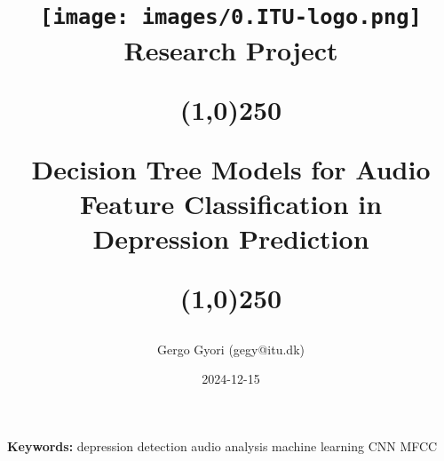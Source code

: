 \documentclass{article}
\title{\texttt{[image: images/0.ITU-logo.png]}\\[1cm] \huge{Research Project}\\
    \begin{center}
    \line(1,0){250}
    \end{center}
    \huge{Decision Tree Models for Audio Feature Classification in Depression Prediction}
    \begin{center}
    \line(1,0){250}
    \end{center}
    }
\author{Gergo Gyori  (gegy@itu.dk)}
\date{2024-12-15}
\begin{document}
\maketitle


\begin{multicols}{2}

\bigskip %
\noindent\textbf{Keywords:} depression detection \textbullet{} audio analysis \textbullet{} machine learning \textbullet{} CNN \textbullet{} MFCC




%





%


\appendix



\clearpage
\printbibliography

\end{multicols}
\end{document}
